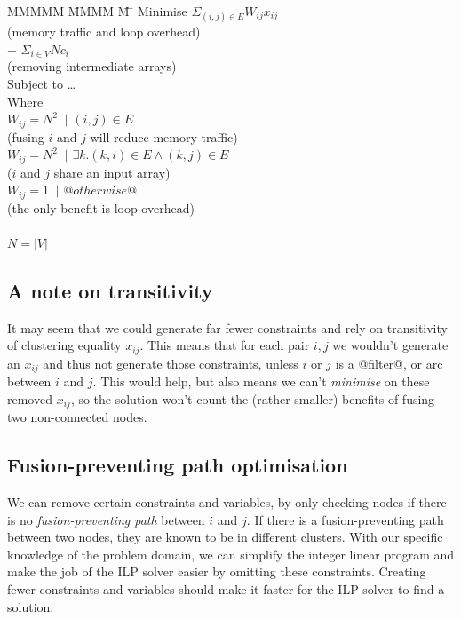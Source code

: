 \begin{tabbing}
MMMMM   \= MMMM \= M \= \kill
Minimise   \>     \> $\Sigma_{(i,j) \in E} W_{ij} x_{ij}$   \\
           \> \> \> (memory traffic and loop overhead)         \\
           \> $+$ \> $\Sigma_{i \in V} N c_i$  \\
           \> \> \> (removing intermediate arrays)         \\
Subject to \> \ldots                                \\
Where      \>                                       \\
           \> $W_{ij} = N^2$ \> $~|$ \> $(i,j) \in E $         \\
           \> \> \> (fusing $i$ and $j$ will reduce memory traffic)         \\
           \> $W_{ij} = N^2$ \> $~|$ \> $\exists k. (k,i) \in E \wedge (k,j) \in E $     \\
           \> \> \> ($i$ and $j$ share an input array)                                         \\
           \> $W_{ij} = 1$   \> $~|$ \> $@otherwise@$                                                  \\
           \> \> \> (the only benefit is loop overhead)                                        \\
           \\
           \> $N = |V|$
\end{tabbing}


\subsection{A note on transitivity}
It may seem that we could generate far fewer constraints and rely on transitivity of clustering equality $x_{ij}$.
This means that for each pair $i,j$ we wouldn't generate an $x_{ij}$ and thus not generate those constraints, unless $i$ or $j$ is a @filter@, or arc between $i$ and $j$.
This would help, but also means we can't \emph{minimise} on these removed $x_{ij}$, so the solution won't count the (rather smaller) benefits of fusing two non-connected nodes.


\subsection{Fusion-preventing path optimisation}
\label{s:OptimisedConstraints}
We can remove certain constraints and variables, by only checking nodes if there is no \emph{fusion-preventing path} between $i$ and $j$.
If there is a fusion-preventing path between two nodes, they are known to be in different clusters.
With our specific knowledge of the problem domain, we can simplify the integer linear program and make the job of the ILP solver easier by omitting these constraints.
Creating fewer constraints and variables should make it faster for the ILP solver to find a solution.

